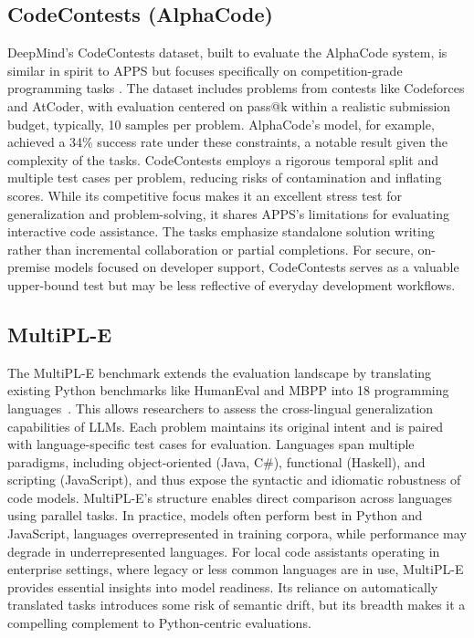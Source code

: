 \subsection{CodeContests (AlphaCode)}
DeepMind’s CodeContests dataset, built to evaluate the AlphaCode system, is similar in spirit to \gls{APPS} but focuses specifically on competition-grade programming tasks \autocite{Li2022}. The dataset includes problems from contests like Codeforces and AtCoder, with evaluation centered on pass@k within a realistic submission budget, typically, 10 samples per problem. AlphaCode’s model, for example, achieved a 34\% success rate under these constraints, a notable result given the complexity of the tasks. CodeContests employs a rigorous temporal split and multiple test cases per problem, reducing risks of contamination and inflating scores. While its competitive focus makes it an excellent stress test for generalization and problem-solving, it shares \gls{APPS}’s limitations for evaluating interactive code assistance. The tasks emphasize standalone solution writing rather than incremental collaboration or partial completions. For secure, on-premise models focused on developer support, CodeContests serves as a valuable upper-bound test but may be less reflective of everyday development workflows.

\subsection{MultiPL-E}
The MultiPL-E benchmark extends the evaluation landscape by translating existing Python benchmarks like HumanEval and \gls{MBPP} into 18 programming languages~\autocite{Cassano2022}. This allows researchers to assess the cross-lingual generalization capabilities of \glspl{LLM}. Each problem maintains its original intent and is paired with language-specific test cases for evaluation. Languages span multiple paradigms, including object-oriented (Java, C\#), functional (Haskell), and scripting (JavaScript), and thus expose the syntactic and idiomatic robustness of code models. MultiPL-E's structure enables direct comparison across languages using parallel tasks. In practice, models often perform best in Python and JavaScript, languages overrepresented in training corpora, while performance may degrade in underrepresented languages. For local code assistants operating in enterprise settings, where legacy or less common languages are in use, MultiPL-E provides essential insights into model readiness. Its reliance on automatically translated tasks introduces some risk of semantic drift, but its breadth makes it a compelling complement to Python-centric evaluations.

